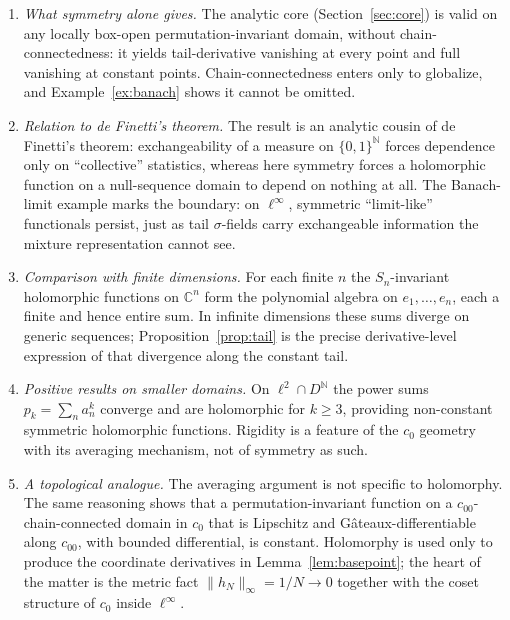 \documentclass[11pt]{amsart}
\newcommand{\NN}{\mathbb{N}}
\newcommand{\CC}{\mathbb{C}}
\newcommand{\cc}{c_{00}}
\newcommand{\czero}{c_{0}}
\theoremstyle{plain}
\theoremstyle{definition}
\theoremstyle{remark}
\begin{document}
\begin{enumerate}[label=\textup{(\arabic*)}, leftmargin=2.4em, itemsep=0.5em]

\item \emph{What symmetry alone gives.} The analytic core
(Section~\ref{sec:core}) is valid on any locally box-open
permutation-invariant domain, without chain-connectedness: it yields
tail-derivative vanishing at every point and full vanishing at constant
points. Chain-connectedness enters only to globalize, and
Example~\ref{ex:banach} shows it cannot be omitted.

\item \emph{Relation to de Finetti's theorem.} The result is an analytic
cousin of de Finetti's theorem: exchangeability of a measure on
$\{0,1\}^\NN$ forces dependence only on ``collective'' statistics, whereas
here symmetry forces a holomorphic function on a null-sequence domain to
depend on nothing at all. The Banach-limit example marks the boundary: on
$\ell^\infty$, symmetric ``limit-like'' functionals persist, just as tail
$\sigma$-fields carry exchangeable information the mixture representation
cannot see.

\item \emph{Comparison with finite dimensions.} For each finite $n$ the
$S_n$-invariant holomorphic functions on $\CC^n$ form the polynomial
algebra on $e_1,\ldots,e_n$, each a finite and hence entire sum. In
infinite dimensions these sums diverge on generic sequences;
Proposition~\ref{prop:tail} is the precise derivative-level expression of
that divergence along the constant tail.

\item \emph{Positive results on smaller domains.} On $\ell^2\cap D^\NN$ the
power sums $p_k=\sum_n a_n^k$ converge and are holomorphic for $k\ge3$,
providing non-constant symmetric holomorphic functions. Rigidity is a
feature of the $\czero$ geometry with its averaging mechanism, not of
symmetry as such.

\item \emph{A topological analogue.} The averaging argument is not specific
to holomorphy. The same reasoning shows that a permutation-invariant
function on a $\cc$-chain-connected domain in $\czero$ that is Lipschitz and
G\^ateaux-differentiable along $\cc$, with bounded differential, is
constant. Holomorphy is used only to produce the coordinate derivatives in
Lemma~\ref{lem:basepoint}; the heart of the matter is the metric fact
$\|h_N\|_\infty=1/N\to0$ together with the coset structure of $\czero$
inside $\ell^\infty$.

\end{enumerate}
\end{document}
